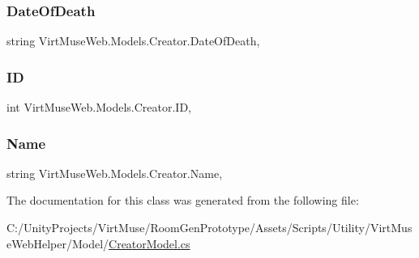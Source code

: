 \subsubsection{\texorpdfstring{Date\+Of\+Death}{DateOfDeath}}
{\footnotesize\ttfamily string Virt\+Muse\+Web.\+Models.\+Creator.\+Date\+Of\+Death\hspace{0.3cm}{\ttfamily [get]}, {\ttfamily [set]}}

\mbox{\label{class_virt_muse_web_1_1_models_1_1_creator_a540ba648434a7b62cec37a82742a2896}} 
\subsubsection{\texorpdfstring{ID}{ID}}
{\footnotesize\ttfamily int Virt\+Muse\+Web.\+Models.\+Creator.\+ID\hspace{0.3cm}{\ttfamily [get]}, {\ttfamily [set]}}

\mbox{\label{class_virt_muse_web_1_1_models_1_1_creator_a4ebb4ac1c0dede1965066e5dc9c13061}} 
\subsubsection{\texorpdfstring{Name}{Name}}
{\footnotesize\ttfamily string Virt\+Muse\+Web.\+Models.\+Creator.\+Name\hspace{0.3cm}{\ttfamily [get]}, {\ttfamily [set]}}



The documentation for this class was generated from the following file\+:\begin{DoxyCompactItemize}
\item 
C\+:/\+Unity\+Projects/\+Virt\+Muse/\+Room\+Gen\+Prototype/\+Assets/\+Scripts/\+Utility/\+Virt\+Muse\+Web\+Helper/\+Model/\mbox{\hyperlink{_creator_model_8cs}{Creator\+Model.\+cs}}\end{DoxyCompactItemize}
